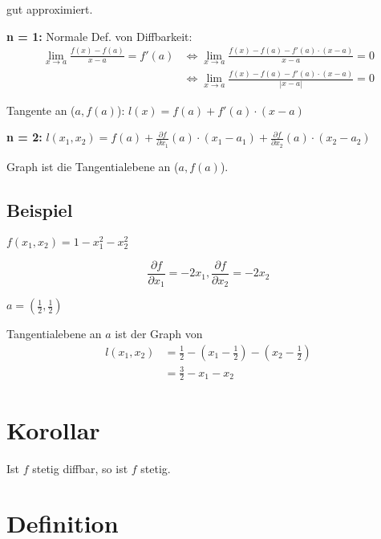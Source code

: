 \documentclass[a4paper, openany]{book}
\begin{document}
          gut approximiert.

          \par \medskip

          \textbf{n = 1:} Normale Def. von Diffbarkeit: \begin{align*} \lim_{x \rightarrow a} \frac{f(x) - f(a)}{x-a} = f'(a)  & \Leftrightarrow \lim_{x \rightarrow a} \frac{f(x) - f(a) - f'(a) \cdot (x-a)}{x-a} = 0 \\ & \Leftrightarrow \lim_{x \rightarrow a} \frac{f(x) - f(a) - f'(a) \cdot (x-a)}{|x-a|} = 0\end{align*}

          Tangente an ($a, f(a)$): $l(x) = f(a) + f'(a) \cdot (x-a)$

          \par \medskip

          \textbf{n = 2:} $l(x_1, x_2) = f(a) + \frac{\partial f}{\partial x_1}(a) \cdot (x_1-a_1) + \frac{\partial f}{\partial x_2} (a) \cdot (x_2 - a_2)$

          Graph ist die Tangentialebene an ($a, f(a)$).

          \subsection{Beispiel}

          $f(x_1, x_2) = 1-x_1^2 - x_2^2$

          \[ \frac{\partial f}{\partial x_1} = -2x_1, \frac{\partial f}{\partial x_2} = -2x_2 \]

          $a = (\frac{1}{2}, \frac{1}{2})$

          \par \medskip

          Tangentialebene an $a$ ist der Graph von \begin{align*} l(x_1, x_2) & = \frac{1}{2} - (x_1- \frac{1}{2}) - (x_2 - \frac{1}{2}) \\ & = \frac{3}{2} - x_1 - x_2 \end{align*}

          \section{Korollar}

          Ist $f$ stetig diffbar, so ist $f$ stetig.

          \section{Definition}
\end{document}
